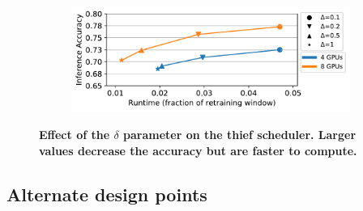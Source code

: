 \begin{figure}
  \centering
  \begin{subfigure}[t]{\linewidth}
    \centering
    \includegraphics[width=\linewidth]{results/sensitivity/sensitivity_delta_acc_runtime_cityscapes_48gpu.pdf}
  \end{subfigure}
  \caption{\small \bf Effect of the $\delta$ parameter on the thief scheduler. Larger values decrease the accuracy but are faster to compute.}
  \label{fig:sensitivity-delta}
\end{figure}


\subsection{Alternate design points}


